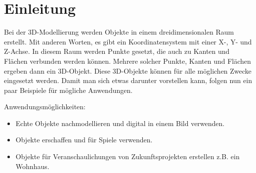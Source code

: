 \section{Einleitung}
Bei der 3D-Modellierung werden Objekte in einem dreidimensionalen Raum erstellt. Mit anderen Worten, es gibt ein Koordinatensystem mit einer X-, Y- und Z-Achse.
In diesem Raum werden Punkte gesetzt, die auch zu Kanten und Flächen verbunden werden können. Mehrere solcher Punkte, Kanten und Flächen ergeben dann ein 3D-Objekt.
Diese 3D-Objekte können für alle möglichen Zwecke eingesetzt werden. Damit man sich etwas darunter vorstellen kann, folgen nun ein paar Beispiele für
mögliche Anwendungen.

Anwendungsmöglichkeiten:
\begin{itemize}
    \item Echte Objekte nachmodellieren und digital in einem Bild verwenden.
    \item Objekte erschaffen und für Spiele verwenden.
    \item Objekte für Veranschaulichungen von Zukunftsprojekten erstellen z.B. ein Wohnhaus.
\end{itemize}
